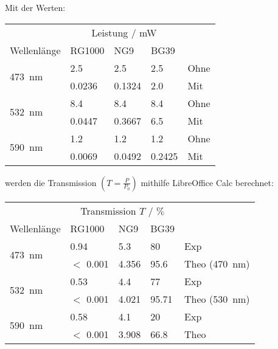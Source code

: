 		Mit der Werten:
		\begin{center}
			\begin{tabular}{lllll}
				\toprule
				& \multicolumn{3}{c}{Leistung / \si{\milli\watt}} & \\
				\cmidrule{2-4}
				Wellenlänge & RG1000 & NG9 & BG39 & \\
				\midrule
				\multirow{2}{*}{\SI{473}{\nano\meter}} 
					& \num{2.5}    & \num{2.5}    & \num{2.5}    & Ohne \\
					& \num{0.0236} & \num{0.1324} & \num{2.0}    & Mit \\
				\multirow{2}{*}{\SI{532}{\nano\meter}} 
					& \num{8.4}    & \num{8.4}    & \num{8.4}    & Ohne \\
					& \num{0.0447} & \num{0.3667} & \num{6.5}    & Mit \\
				\multirow{2}{*}{\SI{590}{\nano\meter}} 
					& \num{1.2}    & \num{1.2}    & \num{1.2}    & Ohne \\
					& \num{0.0069} & \num{0.0492} & \num{0.2425} & Mit \\
				\bottomrule
			\end{tabular}
		\end{center}
		werden die Transmission $\left(T = \frac{P}{P_0}\right)$ mithilfe LibreOffice Calc berechnet:
		\begin{center}
			\begin{tabular}{lllll}
				\toprule
				& \multicolumn{3}{c}{Transmission $T$ / $\%$} & \\
				\cmidrule{2-4}
				Wellenlänge & RG1000 & NG9 & BG39 & \\
				\midrule
				\multirow{2}{*}{\SI{473}{\nano\meter}} 
					& \num{0.94}      & \num{5.3}   & \num{80}   & Exp \\
					& $<$ \num{0.001} & \num{4.356} & \num{95.6} & Theo (\SI{470}{\nano\meter}) \\
				\multirow{2}{*}{\SI{532}{\nano\meter}} 
					& \num{0.53}      & \num{4.4}   & \num{77}     & Exp \\
					& $<$ \num{0.001} & \num{4.021} & \num{95.71}  & Theo (\SI{530}{\nano\meter}) \\
				\multirow{2}{*}{\SI{590}{\nano\meter}} 
					& \num{0.58}      & \num{4.1}   & \num{20}    & Exp \\
					& $<$ \num{0.001} & \num{3.908} & \num{66.8}  & Theo \\
				\bottomrule
			\end{tabular}
		\end{center}

